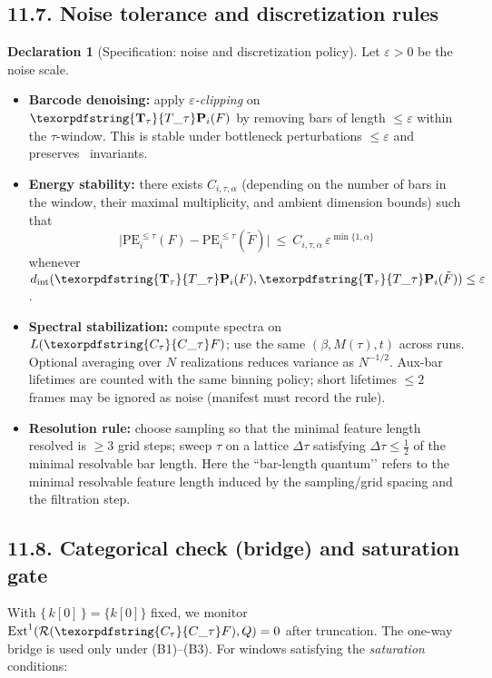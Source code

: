 \documentclass[11pt]{article}
\DeclareMathOperator{\Ext}{Ext}
\newcommand{\Rfun}{\mathcal{R}}
\numberwithin{equation}{section}
\theoremstyle{definition}
\newtheorem{declaration}[theorem]{Declaration}
\DeclareRobustCommand{\Ttau}{\texorpdfstring{\ensuremath{\mathbf{T}_{\tau}}}{T\_\tau}}
\DeclareRobustCommand{\Ctau}{\texorpdfstring{\ensuremath{C_{\tau}}}{C\_\tau}}
\DeclareRobustCommand{\fqi}{\text{f.q.i.}}
\DeclareRobustCommand{\Qtest}{\{\,k[0]\,\}}
\begin{document}
\subsection*{11.7. Noise tolerance and discretization rules}
\begin{declaration}[Specification: noise and discretization policy]\label{spec:11-noise}
Let $\varepsilon>0$ be the noise scale.
\begin{itemize}
  \item \textbf{Barcode denoising:} apply \emph{$\varepsilon$-clipping} on $\Ttau\mathbf{P}_i(F)$ by removing bars of length $\le \varepsilon$ within the $\tau$-window. This is stable under bottleneck perturbations $\le \varepsilon$ and preserves \fqi\ invariants.
  \item \textbf{Energy stability:} there exists $C_{i,\tau,\alpha}$ (depending on the number of bars in the window, their maximal multiplicity, and ambient dimension bounds) such that
  \[
    \big|\mathrm{PE}_{i}^{\le \tau}(F)-\mathrm{PE}_{i}^{\le \tau}(\tilde F)\big|\ \le\ C_{i,\tau,\alpha}\,\varepsilon^{\min\{1,\alpha\}}
  \]
  whenever $d_{\mathrm{int}}(\Ttau\mathbf{P}_i(F),\Ttau\mathbf{P}_i(\tilde F))\le \varepsilon$.
  \item \textbf{Spectral stabilization:} compute spectra on $L(\Ctau F)$; use the same $(\beta,M(\tau),t)$ across runs. Optional averaging over $N$ realizations reduces variance as $N^{-1/2}$. Aux-bar lifetimes are counted with the same binning policy; short lifetimes $\le 2$ frames may be ignored as noise (manifest must record the rule).
  \item \textbf{Resolution rule:} choose sampling so that the minimal feature length resolved is $\ge 3$ grid steps; sweep $\tau$ on a lattice $\Delta\tau$ satisfying $\Delta\tau\le \tfrac{1}{2}$ of the minimal resolvable bar length. Here the “bar-length quantum’’ refers to the minimal resolvable feature length induced by the sampling/grid spacing and the filtration step.
\end{itemize}
\end{declaration}

\subsection*{11.8. Categorical check (bridge) and saturation gate}
With $\Qtest=\{k[0]\}$ fixed, we monitor $\Ext^1(\Rfun(\Ctau F),Q)=0$ after truncation. The one-way bridge is used only under (B1)–(B3). For windows satisfying the \emph{saturation} conditions:
\end{document}
